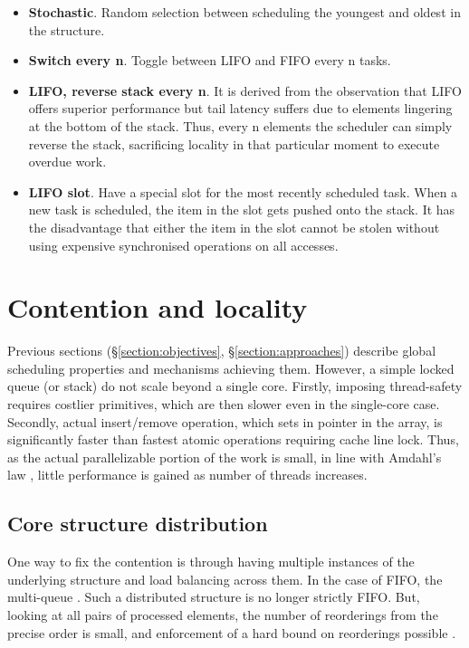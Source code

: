 \documentclass[12pt,a4paper,twoside]{report}
\begin{document}
\begin{itemize}
    \item \textbf{Stochastic}. Random selection between scheduling the youngest and oldest in the structure. 
    \item \textbf{Switch every n}. Toggle between LIFO and FIFO every n tasks.
    \item \textbf{LIFO, reverse stack every n}. It is derived from the observation that LIFO offers superior performance but tail latency suffers due to elements lingering at the bottom of the stack. Thus, every n elements the scheduler can simply reverse the stack, sacrificing locality in that particular moment to execute overdue work.    
    \item \textbf{LIFO slot}. Have a special slot for the most recently scheduled task. When a new task is scheduled, the item in the slot gets pushed onto the stack. It has the disadvantage that either the item in the slot cannot be stolen without using expensive synchronised operations on all accesses.
\end{itemize}


\section{Contention and locality}
\label{section:global_local}


Previous sections (\S\ref{section:objectives}, \S\ref{section:approaches}) describe global scheduling properties and mechanisms achieving them. However, a simple locked queue (or stack) do not scale beyond a single core. Firstly, imposing thread-safety requires costlier primitives, which are then slower even in the single-core case. Secondly, actual insert/remove operation, which sets in pointer in the array, is significantly faster than fastest atomic operations requiring cache line lock. Thus, as the actual parallelizable portion of the work is small, in line with Amdahl's law \cite{amdahl}, little performance is gained as number of threads increases. 

\subsection{Core structure distribution}
\label{section:core_struct_dist}

One way to fix the contention is through having multiple instances of the underlying structure and load balancing across them. In the case of FIFO, the multi-queue \cite{Postnikova2022}. Such a distributed structure is no longer strictly FIFO. But, looking at all pairs of processed elements, the number of reorderings from the precise order is small, and enforcement of a hard bound on reorderings possible \cite{Kirsch2013}. 
\end{document}
